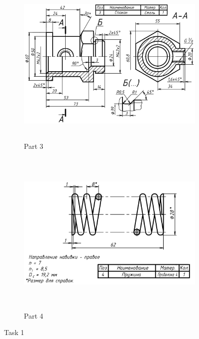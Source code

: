 \documentclass[12pt]{article}
\begin{document}
\begin{figure}[H]
    \begin{subfigure}{0.49\textwidth}
        \centering\includegraphics[height=8cm,width=1\textwidth,keepaspectratio]{resources_CAD/global_var1/t3.png}
        \caption{Part 3}
        \label{fig:resources_CAD/global_var1/t3.png}
    \end{subfigure}
    \begin{subfigure}{0.49\textwidth}
        \centering\includegraphics[height=8cm,width=1\textwidth,keepaspectratio]{resources_CAD/global_var1/t4.png}
        \caption{Part 4}
        \label{fig:resources_CAD/global_var1/t4.png}
    \end{subfigure}
\caption{Task 1}
\label{fig:t11}
\end{figure}
\end{document}
